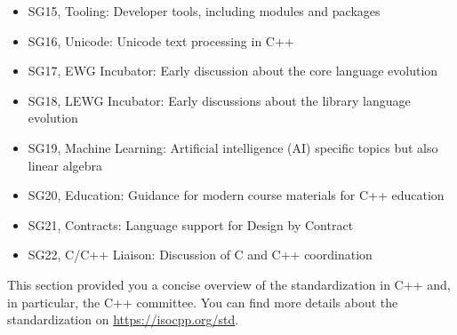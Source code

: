 \begin{itemize}
\item 
SG15, Tooling: Developer tools, including modules and packages

\item 
SG16, Unicode: Unicode text processing in C++

\item 
SG17, EWG Incubator: Early discussion about the core language evolution

\item 
SG18, LEWG Incubator: Early discussions about the library language evolution

\item 
SG19, Machine Learning: Artificial intelligence (AI) specific topics but also linear algebra

\item 
SG20, Education: Guidance for modern course materials for C++ education

\item 
SG21, Contracts: Language support for Design by Contract

\item 
SG22, C/C++ Liaison: Discussion of C and C++ coordination
\end{itemize}

This section provided you a concise overview of the standardization in C++ and, in particular, the C++ committee. You can find more details about the standardization on \url{https://isocpp.org/std}.













